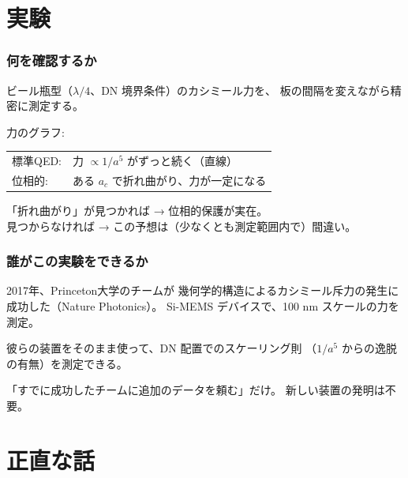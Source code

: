 \documentclass[12pt,a4paper]{article}
\begin{document}
\part{実験}

\section{何を確認するか}

\begin{resultbox}[最もシンプルな実験]
ビール瓶型（$\lambda/4$、DN 境界条件）のカシミール力を、
板の間隔を変えながら精密に測定する。

力のグラフ:

\vspace{0.3cm}
\begin{center}
\begin{tabular}{ll}
標準QED: & 力 $\propto 1/a^5$ がずっと続く（直線） \\
位相的: & ある $a_c$ で折れ曲がり、力が一定になる \\
\end{tabular}
\end{center}
\vspace{0.3cm}

「折れ曲がり」が見つかれば → 位相的保護が実在。\\
見つからなければ → この予想は（少なくとも測定範囲内で）間違い。
\end{resultbox}

\section{誰がこの実験をできるか}

\begin{storybox}[Princeton大学]
2017年、Princeton大学のチームが
幾何学的構造によるカシミール斥力の発生に成功した（Nature Photonics）。
Si-MEMS デバイスで、100 nm スケールの力を測定。

彼らの装置をそのまま使って、DN 配置でのスケーリング則
（$1/a^5$ からの逸脱の有無）を測定できる。

「すでに成功したチームに追加のデータを頼む」だけ。
新しい装置の発明は不要。
\end{storybox}

\part{正直な話}
\end{document}
